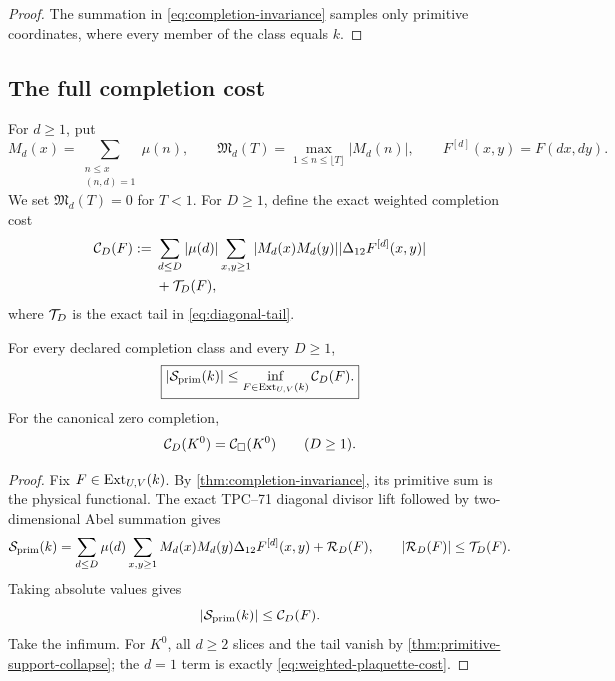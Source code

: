 \begin{proof}
The summation in \eqref{eq:completion-invariance} samples only primitive
coordinates, where every member of the class equals \(k\).
\end{proof}

\subsection{The full completion cost}

For \(d\ge1\), put
\[
 M_d(x)=\sum_{\substack{n\le x\\(n,d)=1}}\mu(n),
 \qquad
 \mathfrak M_d(T)
 =\max_{1\le n\le\lfloor T\rfloor}|M_d(n)|,
 \qquad
 F^{[d]}(x,y)=F(dx,dy).
\]
We set \(\mathfrak M_d(T)=0\) for \(T<1\).
For \(D\ge1\), define the exact weighted completion cost
\begin{align}
 \mathcal C_D(F)
 :={}&
 \sum_{d\le D}|\mu(d)|
 \sum_{x,y\ge1}
 |M_d(x)M_d(y)|
 |\Delta_{12}F^{[d]}(x,y)|
 \notag\\
 &+
 \mathcal T_D(F),
 \label{eq:full-completion-cost}
\end{align}
where \(\mathcal T_D\) is the exact tail in
\eqref{eq:diagonal-tail}.

\begin{theorem}
\label{thm:completion-gauge}
For every declared completion class and every \(D\ge1\),
\begin{equation}
 \boxed{
 |\mathcal S_{\rm prim}(k)|
 \le
 \inf_{F\in\operatorname{Ext}_{U,V}(k)}\mathcal C_D(F).}
 \label{eq:completion-gauge}
\end{equation}
For the canonical zero completion,
\begin{equation}
 \mathcal C_D(K^0)=\mathcal C_\square(K^0)
 \qquad(D\ge1).
 \label{eq:canonical-cost-collapse}
\end{equation}
\end{theorem}

\begin{proof}
Fix \(F\in\operatorname{Ext}_{U,V}(k)\).  By
\cref{thm:completion-invariance}, its primitive sum is the physical
functional.  The exact TPC--71 diagonal divisor lift
\citep{WangTPC71} followed by
two-dimensional Abel summation gives
\[
 \mathcal S_{\rm prim}(k)
 =
 \sum_{d\le D}\mu(d)
 \sum_{x,y\ge1}
 M_d(x)M_d(y)\Delta_{12}F^{[d]}(x,y)
 +\mathcal R_D(F),
 \qquad
 |\mathcal R_D(F)|\le\mathcal T_D(F).
\]
Taking absolute values gives
\[
 |\mathcal S_{\rm prim}(k)|\le\mathcal C_D(F).
\]
Take the infimum.  For \(K^0\), all \(d\ge2\) slices and the tail vanish by
\cref{thm:primitive-support-collapse}; the \(d=1\) term is exactly
\eqref{eq:weighted-plaquette-cost}.
\end{proof}


